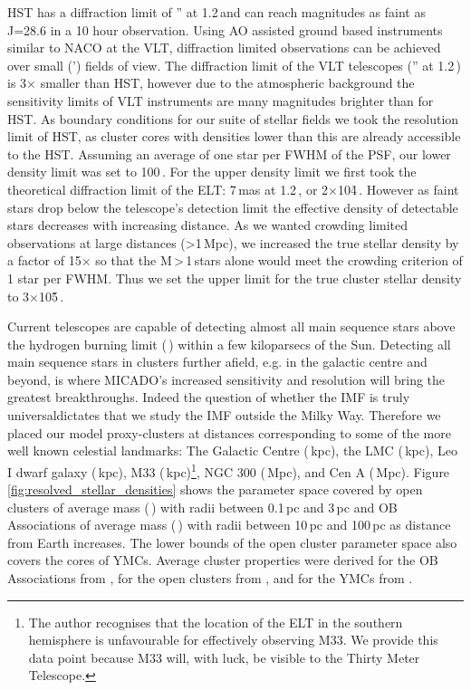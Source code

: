 HST has a diffraction limit of '' at 1.2\,\um and can reach magnitudes as faint as J=28.6\m \citep{hst_wfc3} in a 10 hour observation. Using AO assisted ground based instruments similar to NACO at the VLT, diffraction limited observations can be achieved over small (') fields of view. 
The diffraction limit of the VLT telescopes ('' at 1.2\,\um) is 3$\times$ smaller than HST, however due to the atmospheric background the sensitivity limits of VLT instruments are many magnitudes brighter than for HST. 
As boundary conditions for our suite of stellar fields we took the resolution limit of HST, as cluster cores with densities lower than this are already accessible to the HST. 
Assuming an average of one star per FWHM of the PSF, our lower density limit was set to 100\,\spa. 
For the upper density limit we first took the theoretical diffraction limit of the ELT: 7\,mas at 1.2\,\ume, or 2$\times$10\h4\,\spae. However as faint stars drop below the telescope's detection limit the effective density of detectable stars decreases with increasing distance. 
As we wanted crowding limited observations at large distances (\textgreater1\,Mpc), we increased the true stellar density by a factor of 15$\times$ so that the M\,\textgreater\,1\,\msun stars alone would meet the crowding criterion of 1 star per FWHM. 
Thus we set the upper limit for the true cluster stellar density to 3$\times$10\h5\,\spa.

Current telescopes are capable of detecting almost all main sequence stars above the hydrogen burning limit (\,\msune) within a few kiloparsecs of the Sun\needcite. 
Detecting all main sequence stars in clusters further afield, e.g. in the galactic centre and beyond, is where MICADO's increased sensitivity and resolution will bring the greatest breakthroughs. 
Indeed the question of whether the IMF is truly universal\correct dictates that we study the IMF outside the Milky Way. 
Therefore we placed our model proxy-clusters at distances corresponding to some of the more well known celestial landmarks: The Galactic Centre (\,kpc), the LMC (\,kpc), Leo I dwarf galaxy (\,kpc), M33 (\,kpc)\footnote{The author recognises that the location of the ELT in the southern hemisphere is unfavourable for effectively observing M33. We provide this data point because M33 will, with luck, be visible to the Thirty Meter Telescope.}, NGC 300 (\,Mpc), and Cen A (\,Mpc). 
Figure \ref{fig:resolved_stellar_densities} shows the parameter space covered by open clusters of average mass (\,\msun) with radii between 0.1\,pc and 3\,pc and OB Associations of average mass (\,\msun) with radii between 10\,pc and 100\,pc as distance from Earth increases. 
The lower bounds of the open cluster parameter space also covers the cores of YMCs. Average cluster properties were derived for the OB Associations from \citet{melnik1995}, for the open clusters from \citet{piskunov2007}, and for the YMCs from \citet{portegies2010}.




